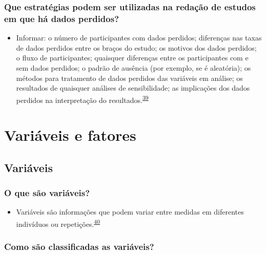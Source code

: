 \documentclass[
]{book}
\providecommand{\tightlist}{%
  \setlength{\itemsep}{0pt}\setlength{\parskip}{0pt}}
\begin{document}
\hypertarget{que-estratuxe9gias-podem-ser-utilizadas-na-redauxe7uxe3o-de-estudos-em-que-huxe1-dados-perdidos}{%
\subsection{Que estratégias podem ser utilizadas na redação de estudos em que há dados perdidos?}\label{que-estratuxe9gias-podem-ser-utilizadas-na-redauxe7uxe3o-de-estudos-em-que-huxe1-dados-perdidos}}

\begin{itemize}
\tightlist
\item
  Informar: o número de participantes com dados perdidos; diferenças nas taxas de dados perdidos entre os braços do estudo; os motivos dos dados perdidos; o fluxo de participantes; quaisquer diferenças entre os participantes com e sem dados perdidos; o padrão de ausência (por exemplo, se é aleatória); os métodos para tratamento de dados perdidos das variáveis em análise; os resultados de quaisquer análises de sensibilidade; as implicações dos dados perdidos na interpretação do resultados.\textsuperscript{\protect\hyperlink{ref-Akl2015}{39}}
\end{itemize}

\hypertarget{variaveis-fatores}{%
\chapter{\texorpdfstring{\textbf{Variáveis e fatores}}{Variáveis e fatores}}\label{variaveis-fatores}}

\hypertarget{variaveis}{%
\section{Variáveis}\label{variaveis}}

\hypertarget{o-que-suxe3o-variuxe1veis}{%
\subsection{O que são variáveis?}\label{o-que-suxe3o-variuxe1veis}}

\begin{itemize}
\tightlist
\item
  Variáveis são informações que podem variar entre medidas em diferentes indivíduos ou repetições.\textsuperscript{\protect\hyperlink{ref-Altman1999}{40}}
\end{itemize}

\hypertarget{como-suxe3o-classificadas-as-variuxe1veis}{%
\subsection{Como são classificadas as variáveis?}\label{como-suxe3o-classificadas-as-variuxe1veis}}
\end{document}
